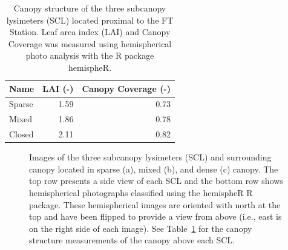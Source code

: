 \documentclass[
  letterpaper,
  DIV=11,
  numbers=noendperiod]{scrartcl}
\begin{document}
\begin{longtable}[]{@{}lrr@{}}

\caption{\label{tbl-scl-lai-cc}Canopy structure of the three subcanopy
lysimeters (SCL) located proximal to the FT Station. Leaf area index
(LAI) and Canopy Coverage was measured using hemispherical photo
analysis with the R package hemispheR.}

\tabularnewline

\toprule\noalign{}
Name & LAI (-) & Canopy Coverage (-) \\
\midrule\noalign{}
\endhead
\bottomrule\noalign{}
\endlastfoot
Sparse & 1.59 & 0.73 \\
Mixed & 1.86 & 0.78 \\
Closed & 2.11 & 0.82 \\

\end{longtable}

\begin{figure}[H]


\caption{\label{fig-scl-imgs}Images of the three subcanopy lysimeters
(SCL) and surrounding canopy located in sparse (a), mixed (b), and dense
(c) canopy. The top row presents a side view of each SCL and the bottom
row shows hemispherical photographs classified using the hemispheR R
package. These hemispherical images are oriented with north at the top
and have been flipped to provide a view from above (i.e., east is on the
right side of each image). See Table~\ref{tbl-scl-lai-cc} for the canopy
structure measurements of the canopy above each SCL.}

\end{figure}%
\end{document}
